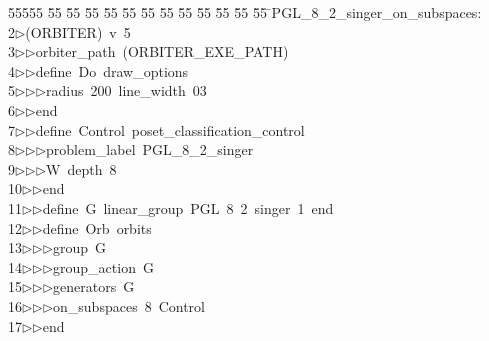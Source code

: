 %
%
\begin{tabbing}
55555 \= 55 \= 55 \= 55 \= 55 \= 55 \= 55 \= 55 \= 55 \= 55 \= 55 \= 55 \= 55 \= \>PGL\_8\_2\_singer\_on\_subspaces:\\[0pt]
2\>$\triangleright$\>(ORBITER)\ v\ 5\ \\[0pt]
3\>$\triangleright$\>$\triangleright$\>orbiter\_path\ (ORBITER\_EXE\_PATH)\ \\[0pt]
4\>$\triangleright$\>$\triangleright$\>define\ Do\ draw\_options\ \\[0pt]
5\>$\triangleright$\>$\triangleright$\>$\triangleright$\>radius\ 200\ line\_width\ 03\ \\[0pt]
6\>$\triangleright$\>$\triangleright$\>end\ \\[0pt]
7\>$\triangleright$\>$\triangleright$\>define\ Control\ poset\_classification\_control\ \\[0pt]
8\>$\triangleright$\>$\triangleright$\>$\triangleright$\>problem\_label\ PGL\_8\_2\_singer\ \\[0pt]
9\>$\triangleright$\>$\triangleright$\>$\triangleright$\>W\ depth\ 8\ \\[0pt]
10\>$\triangleright$\>$\triangleright$\>end\ \\[0pt]
11\>$\triangleright$\>$\triangleright$\>define\ G\ linear\_group\ PGL\ 8\ 2\ singer\ 1\ end\ \\[0pt]
12\>$\triangleright$\>$\triangleright$\>define\ Orb\ orbits\ \\[0pt]
13\>$\triangleright$\>$\triangleright$\>$\triangleright$\>group\ G\ \\[0pt]
14\>$\triangleright$\>$\triangleright$\>$\triangleright$\>group\_action\ G\ \\[0pt]
15\>$\triangleright$\>$\triangleright$\>$\triangleright$\>generators\ G\ \\[0pt]
16\>$\triangleright$\>$\triangleright$\>$\triangleright$\>on\_subspaces\ 8\ Control\ \\[0pt]
17\>$\triangleright$\>$\triangleright$\>end\ \\[0pt]

\end{tabbing}
